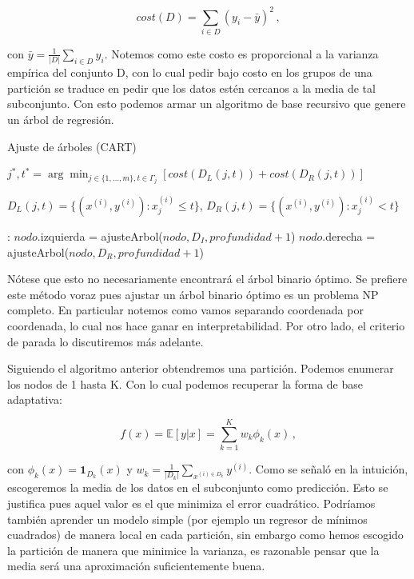 \begin{equation}
    cost(D) = \sum_{i \in D} (y_i - \bar y)^2 \,,
\end{equation}

con $\bar y = \frac{1}{|D|} \sum_{i \in D} y_i $. Notemos como este costo es proporcional a la varianza empírica del conjunto D, con lo cual pedir bajo costo en los grupos de una partición se traduce en pedir que los datos estén cercanos a la media de tal subconjunto. Con esto podemos armar un algoritmo de base recursivo que genere un árbol de regresión.


\begin{algorithm}[H]
  \caption{Ajuste de árboles (CART)
    \label{alg:CART}}
  \begin{algorithmic}[1]
      \State $j^*, t^* = \arg\min_{j \in \{1,\dots,m\}, t \in \Gamma_j} \left[ cost(D_L(j,t)) + cost(D_R(j,t)) \right]$

        $D_L(j,t) = \{(x^{(i)}, y^{(i)}) : x_j^{(i)} \leq t \}$, $D_R(j,t) = \{(x^{(i)}, y^{(i)}) : x_j^{(i)} < t \}$
      
      :
      \Else
        \State $nodo$.izquierda = ajusteArbol($nodo, D_I, profundidad + 1$)
        \State $nodo$.derecha = ajusteArbol($nodo, D_R, profundidad + 1$)
      \EndIf
    \EndFunction
  \end{algorithmic}
\end{algorithm}

Nótese que esto no necesariamente encontrará el árbol binario óptimo. Se prefiere este método voraz pues ajustar un árbol binario óptimo es un problema NP completo. En particular notemos como vamos separando coordenada por coordenada, lo cual nos hace ganar en interpretabilidad. Por otro lado, el 
 criterio de parada lo discutiremos más adelante.

Siguiendo el algoritmo anterior obtendremos una partición. Podemos enumerar los nodos de 1 hasta K. Con lo cual podemos recuperar la forma de base adaptativa:

\begin{equation}
    f(x) = \mathbb{E}[y | x] = \sum^K_{k=1} w_k \phi_k(x) \,,
\end{equation}

con $\phi_k(x) = \mathbf{1}_{D_k}(x)$ y $w_k = \frac{1}{|D_k|} \sum_{x^{(i) \in D_k}} y^{(i)}$. Como se señaló en la intuición, escogeremos la media de los datos en el subconjunto como predicción. Esto se justifica pues aquel valor es el que minimiza el error cuadrático. Podríamos también aprender un modelo simple (por ejemplo un regresor de mínimos cuadrados) de manera local en cada partición, sin embargo como hemos escogido la partición de manera que minimice la varianza, es razonable pensar que la media será una aproximación suficientemente buena.


